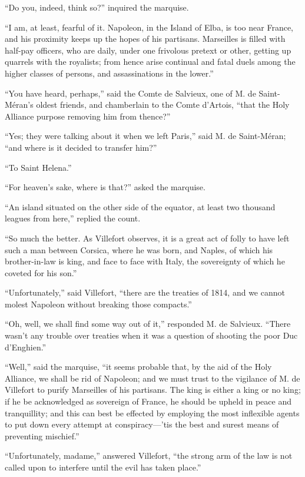 “Do you, indeed, think so?” inquired the marquise.

“I am, at least, fearful of it. Napoleon, in the Island of Elba, is too
near France, and his proximity keeps up the hopes of his partisans.
Marseilles is filled with half-pay officers, who are daily, under one
frivolous pretext or other, getting up quarrels with the royalists;
from hence arise continual and fatal duels among the higher classes of
persons, and assassinations in the lower.”

“You have heard, perhaps,” said the Comte de Salvieux, one of M. de
Saint-Méran’s oldest friends, and chamberlain to the Comte d’Artois,
“that the Holy Alliance purpose removing him from thence?”

“Yes; they were talking about it when we left Paris,” said M. de
Saint-Méran; “and where is it decided to transfer him?”

“To Saint Helena.”

“For heaven’s sake, where is that?” asked the marquise.

“An island situated on the other side of the equator, at least two
thousand leagues from here,” replied the count.

“So much the better. As Villefort observes, it is a great act of folly
to have left such a man between Corsica, where he was born, and Naples,
of which his brother-in-law is king, and face to face with Italy, the
sovereignty of which he coveted for his son.”

“Unfortunately,” said Villefort, “there are the treaties of 1814, and
we cannot molest Napoleon without breaking those compacts.”

“Oh, well, we shall find some way out of it,” responded M. de Salvieux.
“There wasn’t any trouble over treaties when it was a question of
shooting the poor Duc d’Enghien.”

“Well,” said the marquise, “it seems probable that, by the aid of the
Holy Alliance, we shall be rid of Napoleon; and we must trust to the
vigilance of M. de Villefort to purify Marseilles of his partisans. The
king is either a king or no king; if he be acknowledged as sovereign of
France, he should be upheld in peace and tranquillity; and this can
best be effected by employing the most inflexible agents to put down
every attempt at conspiracy—’tis the best and surest means of
preventing mischief.”

“Unfortunately, madame,” answered Villefort, “the strong arm of the law
is not called upon to interfere until the evil has taken place.”

